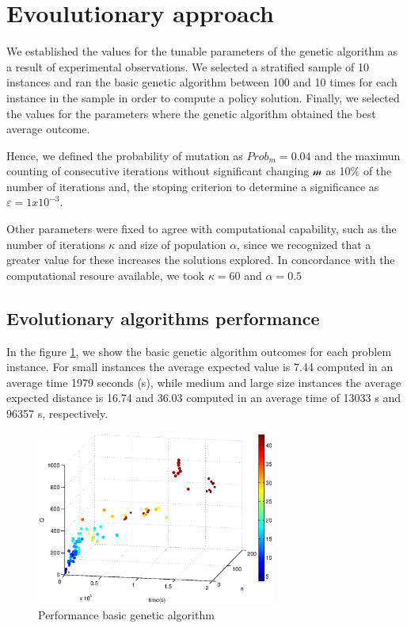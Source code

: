 \section{Evoulutionary approach}

We established the values for the tunable parameters of the genetic algorithm as a result of experimental observations. We selected a stratified sample of 10 instances and ran the basic genetic algorithm between 100 and 10 times for each instance in the sample in order to compute a policy solution. Finally, we selected the values for the parameters where the genetic algorithm obtained the best average outcome.

Hence, we defined the probability of mutation as $Prob_m = 0.04$ and the maximun counting of consecutive iterations without significant changing $\mathcal{m}$ as 10\% of the number of iterations and, the stoping criterion to determine a significance as $\varepsilon = 1x10^{-3}$.

Other parameters were fixed to agree with computational capability, such as the number of iterations $\kappa$ and size of population $\alpha$, since we recognized that a greater value for these increases the solutions explored. In concordance with the computational resoure available, we took $\kappa = 60$ and $\alpha = 0.5$


\subsection{Evolutionary algorithms performance}

In the figure \ref{fig:compare_expected_distance_ga}, we show the basic genetic algorithm outcomes for each problem instance.  For small instances the average expected value is 7.44 computed in an average time 1979 seconds (s), while medium and large size instances the average expected distance is 16.74 and 36.03 computed in an average time of 13033 s and 96357 s, respectively.


\begin{figure}[!htbp]
  \begin{center}
   \includegraphics[width=0.7\textwidth]{Images/Chapter5/compare_expected_distance_ga.eps}
  \end{center}
    \caption{Performance basic genetic algorithm}\label{fig:compare_expected_distance_ga}
\end{figure}


